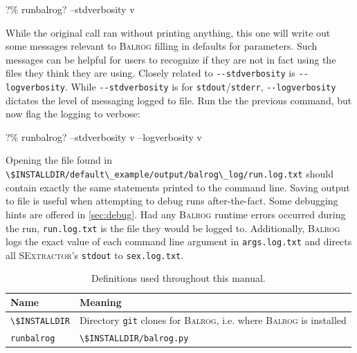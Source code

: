 \documentclass[12pt]{book}
\newcommand{\codett}[1]{\lstinline{#1}}
\newcommand{\balrog}{\textsc{Balrog}}
\newcommand{\sex}{\textsc{SExtractor}}
\newcommand{\opt}[1]{\codett{--#1}}
\newcommand{\bcmd}{\% runbalrog}
\begin{document}
\begin{cmdline}
?\bcmd{}? --stdverbosity v
\end{cmdline}

\noindent While the original call ran without printing anything, this one will write out some messages
relevant to \balrog{} filling in defaults for parameters.
Such messages can be helpful for users to recognize 
if they are not in fact using the files they think they are using.
Closely related to \opt{stdverbosity} is \opt{logverbosity}.
While \opt{stdverbosity} is for \codett{stdout}/\codett{stderr},
\opt{logverbosity} dictates the level of messaging logged to file.
Run the the previous command, but now flag the logging to verbose:

\begin{cmdline}
?\bcmd? --stdverbosity v --logverbosity v
\end{cmdline}

\noindent Opening the file found in \codett{\$INSTALLDIR/default\_example/output/balrog\_log/run.log.txt}
should contain exactly the same statements printed to the command line.
Saving output to file is useful when attempting to debug runs after-the-fact.
Some debugging hints are offered in \autoref{sec:debug}.
Had any \balrog{} runtime errors occurred during the run,
\codett{run.log.txt} is the file they would be logged to.
Additionally, \balrog{} logs the exact value of each command line argument  in \codett{args.log.txt}
and directs all \sex{}'s \codett{stdout} to \codett{sex.log.txt}.

\begin{table}
\caption{Definitions used throughout this manual.}
\label{tab:def}
\begin{tabular}{l l}
\toprule \toprule
\textbf{Name} & \textbf{Meaning} \\ \midrule
\codett{\$INSTALLDIR} & Directory \codett{git} clones for \balrog{}, i.e. where \balrog{} is installed \\
\codett{runbalrog} & \codett{\$INSTALLDIR/balrog.py} \\ \bottomrule \bottomrule
\end{tabular}
\end{table}
\end{document}
